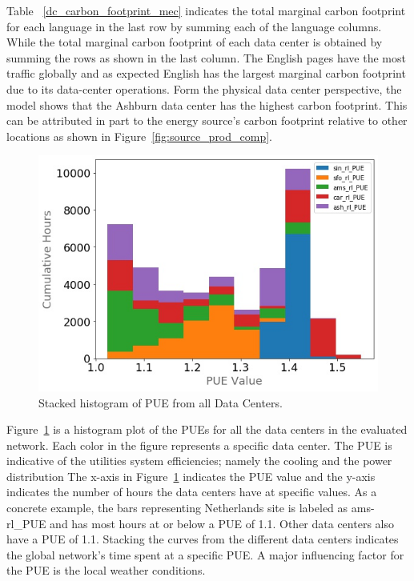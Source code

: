 Table~ \ref{dc_carbon_footprint_mec} indicates the total marginal carbon footprint for each language in the last row by summing each of the language columns. While the total marginal carbon footprint of each data center is obtained by summing the rows as shown in the last column. The English pages have the most traffic globally and as expected English has the largest marginal carbon footprint due to its data-center operations. Form the physical data center perspective, the model shows that the Ashburn data center has the highest carbon footprint. This can be attributed in part to the energy source's carbon footprint relative to other locations as shown in Figure~\ref{fig:source_prod_comp}.




\begin{figure}
  \centering
  \includegraphics[scale=.40]{marginal_energy_cost/img/pue.jpg}
  \caption{Stacked histogram of PUE from all Data Centers.}
  \label{fig:pue}
  \end{figure}
  
Figure~\ref{fig:pue} is a histogram plot of the PUEs for all the data centers in the evaluated network. Each color in the figure represents a specific data center. The PUE is indicative of the utilities system efficiencies; namely the cooling and the power distribution The x-axis in Figure~\ref{fig:pue} indicates the PUE value and the y-axis indicates the number of hours the data centers have at specific values. As a concrete example, the bars representing Netherlands site is labeled as ams-rl\_PUE and has most hours at or below a PUE of 1.1. Other data centers also have a PUE of 1.1. Stacking the curves from the different data centers indicates the global network's time spent at a specific PUE. A major influencing factor for the PUE is the local weather conditions. 

